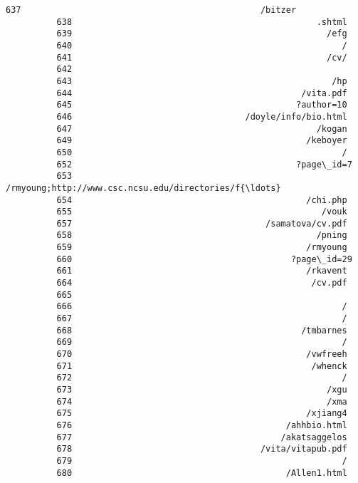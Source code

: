 \documentclass[11pt]{article}
\begin{document}
\begin{Verbatim}[commandchars=\\\{\}]
          637                                               /bitzer
          638                                                .shtml
          639                                                  /efg
          640                                                     /
          641                                                  /cv/
          642                                                      
          643                                                   /hp
          644                                             /vita.pdf
          645                                            ?author=10
          646                                  /doyle/info/bio.html
          647                                                /kogan
          649                                              /keboyer
          650                                                     /
          652                                            ?page\_id=7
          653     /rmyoung;http://www.csc.ncsu.edu/directories/f{\ldots}
          654                                              /chi.php
          655                                                 /vouk
          657                                      /samatova/cv.pdf
          658                                                /pning
          659                                              /rmyoung
          660                                           ?page\_id=29
          661                                              /rkavent
          664                                               /cv.pdf
          665                                                      
          666                                                     /
          667                                                     /
          668                                             /tmbarnes
          669                                                     /
          670                                              /vwfreeh
          671                                               /whenck
          672                                                     /
          673                                                  /xgu
          674                                                  /xma
          675                                              /xjiang4
          676                                          /ahhbio.html
          677                                         /akatsaggelos
          678                                     /vita/vitapub.pdf
          679                                                     /
          680                                          /Allen1.html

\end{Verbatim}
\end{document}
